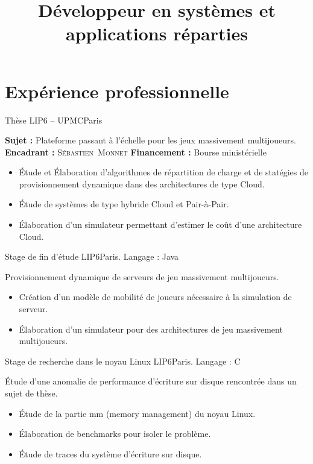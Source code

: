 \documentclass[11pt,a4paper,sans]{moderncv}
\title{Développeur en systèmes et applications réparties}
\begin{document}
\makecvtitle %
\vspace*{-0.5cm}


\section{Expérience professionnelle}
\vspace{1em}

        {Thèse}
        {LIP6 -- UPMC}{Paris}{}
        {
            \textbf{Sujet :} Plateforme passant à l'échelle pour les jeux massivement multijoueurs.\endgraf
            \textbf{Encadrant :} \textsc{Sébastien~Monnet}\hfill
            \textbf{Financement :} Bourse ministérielle\hfill~\endgraf
            \begin{itemize}
                \item\'Etude et \'Elaboration d'algorithmes de répartition de charge et de statégies de provisionnement dynamique dans des architectures de type Cloud.
                \item\'Etude de systèmes de type hybride Cloud et Pair-à-Pair.
                \item\'Elaboration d'un simulateur permettant d'estimer le coût d'une architecture Cloud.
            \end{itemize}
        }

\vspace{1em}

        {Stage de fin d'étude}
        {\textsc{LIP6}}{Paris. Langage : Java}{}
        {
            Provisionnement dynamique de serveurs de jeu massivement multijoueurs.
            \begin{itemize}
                \item Création d'un modèle de mobilité de joueurs nécessaire à la simulation de serveur.
                \item\'Elaboration d'un simulateur pour des architectures de jeu massivement multijoueurs.
            \end{itemize}
        }

\vspace{1em}

        {Stage de recherche dans le noyau Linux}
        {\textsc{LIP6}}{Paris. Langage : C}{}
        {
            \'Etude d'une anomalie de performance d'écriture sur disque rencontrée dans un sujet de thèse.
            \begin{itemize}
                \item\'Etude de la partie mm (memory management) du noyau Linux.
                \item\'Elaboration de benchmarks pour isoler le problème.
                \item\'Etude de traces du système d'écriture sur disque.
            \end{itemize}
        }
\end{document}
